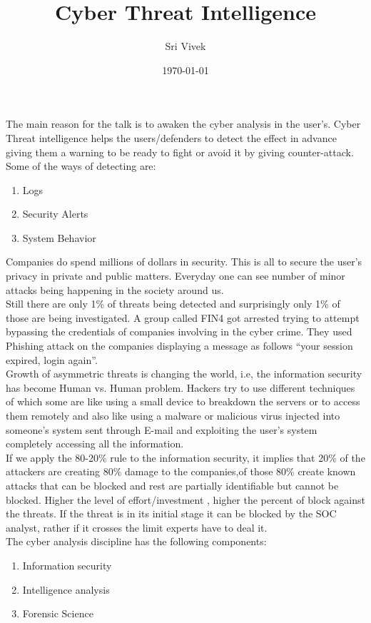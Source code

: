 \documentclass[a4paper, 11pt]{article}
\title{Cyber Threat Intelligence}
\author{Sri Vivek}
\date{\today}
\begin{document}
\maketitle

	The main reason for the talk is to awaken the cyber analysis in the user's. Cyber Threat intelligence helps the users/defenders to detect the effect in advance giving them a warning to be ready to fight or avoid it by giving counter-attack.
    \\
    
	Some of the ways of detecting are:
\begin{enumerate}
\item Logs
\item Security Alerts
\item System Behavior
\end{enumerate}

	Companies do spend millions of dollars in security. This is all to secure the user's privacy in private and public matters. Everyday one can see number of minor attacks being happening in the society around us. 
    \\
	Still there are only 1\% of threats being detected and surprisingly only 1\% of those are being investigated. A group called FIN4 got arrested trying to attempt bypassing the credentials of companies involving in the cyber crime. They used Phishing attack on the companies displaying a message as follows  “your session expired, login again”. 
	\\
    
    Growth of asymmetric threats is changing the world, i.e, the information security has become Human vs. Human problem. Hackers try to use different techniques of which some are like using a small device to breakdown the servers or to access them remotely and also like using a malware or malicious virus injected into someone's system sent through E-mail and exploiting the user's system completely accessing all the information.
	\\
    If we apply the 80-20\% rule to the information security, it implies that 20\% of the attackers are creating 80\% damage to the companies,of those 80\% create known attacks that can be blocked and rest are partially identifiable but cannot be blocked. Higher the level of effort/investment , higher the percent of block against the threats. If the threat is in its initial stage it can be blocked by the SOC analyst, rather if it crosses the limit experts have to deal it. 
\\
The cyber analysis discipline has the following components:
\begin{enumerate}
\item Information security
\item Intelligence analysis
\item Forensic Science
\end{enumerate}
\end{document}
